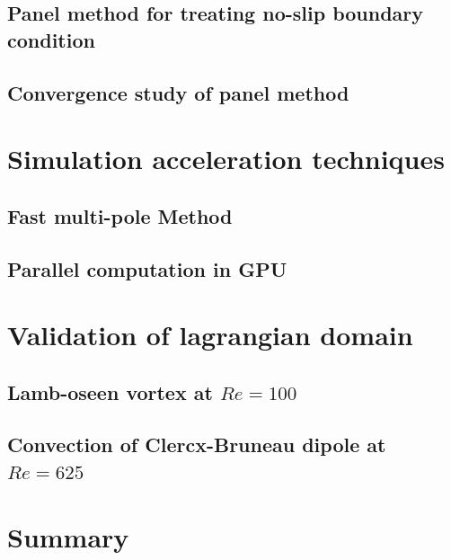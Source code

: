 \subsection{Panel method for treating no-slip boundary condition}

\subsection{Convergence study of panel method}

\section{Simulation acceleration techniques}

\subsection{Fast multi-pole Method}

\subsection{Parallel computation in GPU}

\section{Validation of lagrangian domain}

\subsection{Lamb-oseen vortex at $Re=100$}

\subsection{Convection of Clercx-Bruneau dipole at $Re=625$}

\section{Summary}



%
%
%
%
